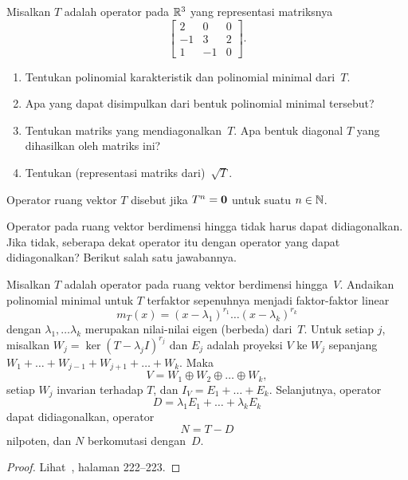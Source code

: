 \begin{exer} Misalkan $T$ adalah operator pada $\mathbb{R}^3$ yang representasi matriksnya
    \[
      \begin{bmatrix}
               2  &  0  &  0 \\
              -1  &  3  &  2 \\
               1  & -1  &  0
      \end{bmatrix}.
    \]
  \begin{enumerate}
    \item Tentukan polinomial karakteristik dan polinomial minimal dari~$T$.
    \item Apa yang dapat disimpulkan dari bentuk polinomial minimal tersebut?
    \item Tentukan matriks yang mendiagonalkan~$T$. Apa bentuk diagonal $T$ yang dihasilkan oleh matriks ini?
    \item Tentukan (representasi matriks dari)~$\sqrt T$.
  \end{enumerate}
\end{exer}

\begin{defn} Operator ruang vektor $T$ disebut
 jika $T^n = \mathbf{0}$ untuk suatu $n \in \mathbb{N}$.
\end{defn}

Operator pada ruang vektor berdimensi hingga tidak harus dapat didiagonalkan. Jika tidak,
seberapa dekat operator itu dengan operator yang dapat didiagonalkan? Berikut salah satu jawabannya.

\begin{thm} Misalkan $T$ adalah operator pada ruang vektor berdimensi hingga~$V$. Andaikan polinomial minimal
untuk $T$ terfaktor sepenuhnya menjadi faktor-faktor linear
   \[ m_T(x) = (x - \lambda_1)^{r_1} \dots (x - \lambda_k)^{r_k} \]
dengan $\lambda_1, \dots \lambda_k$ merupakan nilai-nilai eigen (berbeda) dari~$T$. Untuk setiap $j$, misalkan
$W_j = \ker(T - \lambda_jI)^{r_j}$ dan $E_j$ adalah proyeksi $V$ ke $W_j$ sepanjang
$W_1 + \dots + W_{j-1} + W_{j+1} + \dots + W_k$. Maka
   \[ V = W_1 \oplus W_2 \oplus \dots \oplus W_k, \]
setiap $W_j$ invarian terhadap $T$, dan $I_V = E_1 + \dots + E_k$. Selanjutnya, operator
   \[ D = \lambda_1E_1 + \dots + \lambda_kE_k \]
dapat didiagonalkan, operator
   \[ N = T - D \]
nilpoten, dan $N$ berkomutasi dengan~$D$.
\end{thm}

\begin{proof} Lihat~\cite{HoffmanK:1971}, halaman 222--223. \ns
\end{proof}

